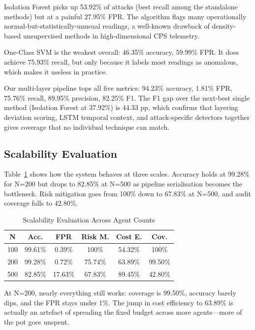 \documentclass[conference]{IEEEtran}
\begin{document}
Isolation Forest picks up 53.92\% of attacks (best recall among the standalone methods) but at a painful 27.95\% FPR. The algorithm flags many operationally normal-but-statistically-unusual readings, a well-known drawback of density-based unsupervised methods in high-dimensional CPS telemetry.

One-Class SVM is the weakest overall: 46.35\% accuracy, 59.99\% FPR. It does achieve 75.93\% recall, but only because it labels most readings as anomalous, which makes it useless in practice.

Our multi-layer pipeline tops all five metrics: 94.23\% accuracy, 1.81\% FPR, 75.76\% recall, 89.95\% precision, 82.25\% F1. The F1 gap over the next-best single method (Isolation Forest at 37.92\%) is 44.33 pp, which confirms that layering deviation scoring, LSTM temporal context, and attack-specific detectors together gives coverage that no individual technique can match.

\subsection{Scalability Evaluation}

Table~\ref{tab:scale} shows how the system behaves at three scales. Accuracy holds at 99.28\% for N=200 but drops to 82.85\% at N=500 as pipeline serialisation becomes the bottleneck. Risk mitigation goes from 100\% down to 67.83\% at N=500, and audit coverage falls to 42.80\%.

\begin{table}[htbp]
\caption{Scalability Evaluation Across Agent Counts}
\begin{center}
\begin{tabular}{|c|c|c|c|c|c|}
\hline
\textbf{N} & \textbf{Acc.} & \textbf{FPR} & \textbf{Risk M.} & \textbf{Cost E.} & \textbf{Cov.} \\
\hline
100 & 99.61\% & 0.39\% & 100\% & 54.32\% & 100\% \\
\hline
200 & 99.28\% & 0.72\% & 75.74\% & 63.89\% & 99.50\% \\
\hline
500 & 82.85\% & 17.63\% & 67.83\% & 89.45\% & 42.80\% \\
\hline
\end{tabular}
\label{tab:scale}
\end{center}
\end{table}

At N=200, nearly everything still works: coverage is 99.50\%, accuracy barely dips, and the FPR stays under 1\%. The jump in cost efficiency to 63.89\% is actually an artefact of spreading the fixed budget across more agents---more of the pot goes unspent.
\end{document}
